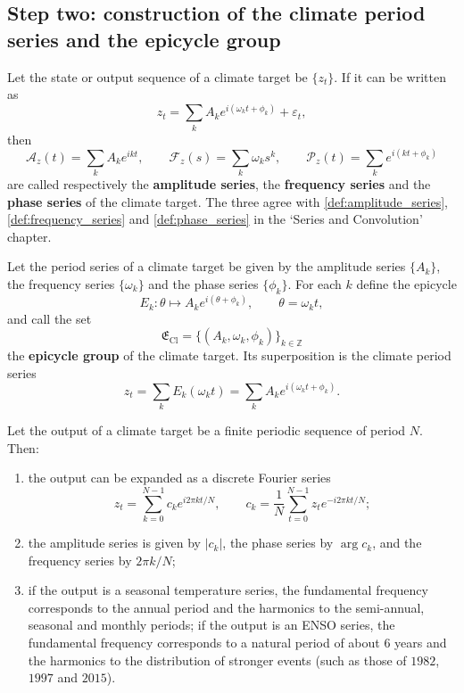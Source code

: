 \subsection{Step two: construction of the climate period series and the epicycle group}

\begin{definition}\label{def:climate_series}
Let the state or output sequence of a climate target be $\{z_t\}$. If it can be written as
\[
z_t=\sum_k A_k e^{i(\omega_k t+\phi_k)}+\varepsilon_t,
\]
then
\[
\mathcal A_z(t)=\sum_k A_k e^{ikt},\qquad
\mathcal F_z(s)=\sum_k \omega_k s^k,\qquad
\mathcal P_z(t)=\sum_k e^{i(kt+\phi_k)}
\]
are called respectively the \textbf{amplitude series}, the \textbf{frequency series} and the \textbf{phase series} of the climate target. The three agree with \cref{def:amplitude_series}, \cref{def:frequency_series} and \cref{def:phase_series} in the `Series and Convolution' chapter.
\end{definition}

\begin{definition}\label{def:climate_epicycle_group}
Let the period series of a climate target be given by the amplitude series $\{A_k\}$, the frequency series $\{\omega_k\}$ and the phase series $\{\phi_k\}$. For each $k$ define the epicycle
\[
E_k:\theta\mapsto A_k e^{i(\theta+\phi_k)},\qquad \theta=\omega_k t,
\]
and call the set
\[
\mathfrak E_{\mathrm{Cl}}=\{(A_k,\omega_k,\phi_k)\}_{k\in\mathbb Z}
\]
the \textbf{epicycle group} of the climate target. Its superposition is the climate period series
\[
z_t=\sum_k E_k(\omega_k t)=\sum_k A_k e^{i(\omega_k t+\phi_k)}.
\]
\end{definition}

\begin{theorem}\label{thm:climate_series_reconstruction}
Let the output of a climate target be a finite periodic sequence of period $N$. Then:
\begin{enumerate}[label=(\roman*)]
    \item the output can be expanded as a discrete Fourier series
    \[
    z_t=\sum_{k=0}^{N-1}c_k e^{i2\pi kt/N},\qquad
    c_k=\frac1N\sum_{t=0}^{N-1}z_t e^{-i2\pi kt/N};
    \]
    \item the amplitude series is given by $|c_k|$, the phase series by $\arg c_k$, and the frequency series by $2\pi k/N$;
    \item if the output is a seasonal temperature series, the fundamental frequency corresponds to the annual period and the harmonics to the semi-annual, seasonal and monthly periods; if the output is an ENSO series, the fundamental frequency corresponds to a natural period of about $6$ years and the harmonics to the distribution of stronger events (such as those of $1982$, $1997$ and $2015$).
\end{enumerate}
\end{theorem}


